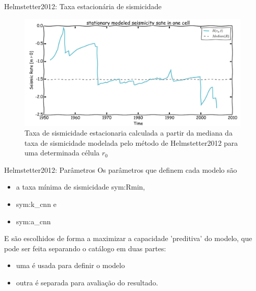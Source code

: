 \documentclass[ucs,8pt]{beamer}
\begin{document}
\begin{frame}{Helmstetter2012: Taxa estacionária de sismicidade}
\begin{figure}[H]
  \centering
  \includegraphics[width=.90\textwidth]{helmstetter_stationary_a} 
  \caption{Taxa de sismicidade estacionaria calculada a partir da mediana da
  taxa de sismicidade modelada pelo método de Helmstetter2012 para uma determinada célula $r_0$}
  \label{fig:h_stationary} 
\end{figure}
\end{frame}


\begin{frame}{Helmstetter2012: Parâmetros}
	Os parâmetros que definem cada modelo são
	\begin{itemize}
		\item a taxa mínima de sismicidade \gls{sym:Rmin},
		\item \gls{sym:k_cnn} e 
		\item \gls{sym:a_cnn}
	\end{itemize}
	
	\vspace{0.8cm}
	
	E são escolhidos de forma a maximizar a capacidade 'preditiva' do modelo,
	que pode ser feita separando o catálogo em duas partes:
	\begin{itemize}
		\item uma é usada para definir o modelo
		\item outra é separada para avaliação do resultado.
	\end{itemize}
\end{frame}
\end{document}

